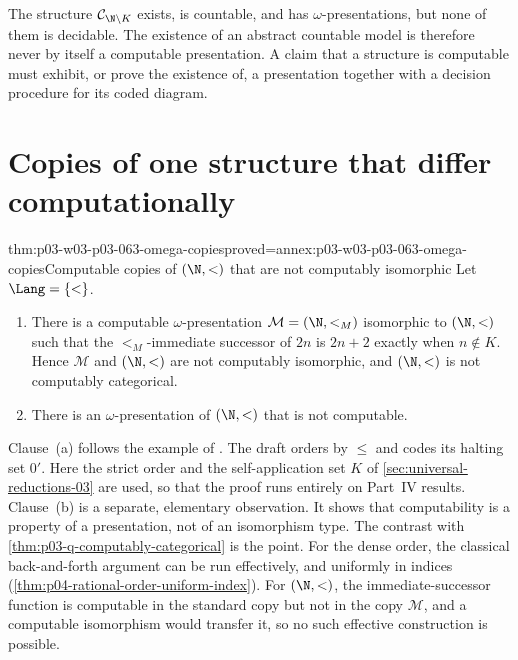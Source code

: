 The structure \(\mathcal C_{\N\setminus K}\) exists, is countable, and has
\(\omega\)-presentations, but none of them is decidable.  The existence of an
abstract countable model is therefore never by itself a computable
presentation.  A claim that a structure is computable must exhibit, or prove
the existence of, a presentation together with a decision procedure for its
coded diagram.

\section{Copies of one structure that differ computationally}
\label{sec:p03-w03-p03-063-copies}

\begin{hbtheorem}{thm:p03-w03-p03-063-omega-copies}{proved=annex:p03-w03-p03-063-omega-copies}{Computable copies of \((\N,<)\) that are not computably isomorphic}
Let \(\Lang=\{<\}\).
\begin{enumerate}
\item There is a computable \(\omega\)-presentation \(\mathcal M=(\N,<_M)\)
  isomorphic to \((\N,<)\) such that the \(<_M\)-immediate successor of
  \(2n\) is \(2n+2\) exactly when \(n\notin K\).  Hence \(\mathcal M\) and
  \((\N,<)\) are not computably isomorphic, and \((\N,<)\) is not computably
  categorical.
\item There is an \(\omega\)-presentation of \((\N,<)\) that is not
  computable.
\end{enumerate}
\end{hbtheorem}

Clause~(a) follows the example of \cite[Section~I.1.2, pp.~2--3]{Montalban2019CSTDraft}.
The draft orders by \(\leq\) and codes its halting set \(0'\).  Here the
strict order and the self-application set \(K\) of
\cref{sec:universal-reductions-03} are used, so that the proof runs
entirely on Part~IV results.  Clause~(b) is a separate, elementary
observation.  It shows that computability is a property of a presentation,
not of an isomorphism type.  The contrast with
\cref{thm:p03-q-computably-categorical} is the point.  For the dense order,
the classical back-and-forth argument can be run effectively, and uniformly
in indices
(\cref{thm:p04-rational-order-uniform-index}).  For \((\N,<)\), the
immediate-successor function is computable in the standard copy but not in
the copy \(\mathcal M\), and a computable isomorphism would transfer it, so no
such effective construction is possible.

